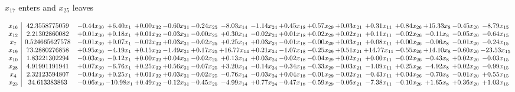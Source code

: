 \documentclass[9pt]{article}
\begin{document}
 $ x_{17} $ enters and $ x_{25} $ leaves 

 \[\begin{array}{c| c c@{\hskip 2pt} c@{\hskip 2pt} c@{\hskip 2pt} c@{\hskip 2pt} c@{\hskip 2pt} c@{\hskip 2pt} c@{\hskip 2pt} c@{\hskip 2pt} c@{\hskip 2pt} c@{\hskip 2pt} c@{\hskip 2pt} c@{\hskip 2pt} c@{\hskip 2pt} c@{\hskip 2pt} c@{\hskip 2pt} }
 x_{16}   &  42.3558775059 & -0.44 x_{30} & +  6.40 x_{1} & +  0.00 x_{32} & -0.60 x_{31} & -0.24 x_{25} & -8.03 x_{14} & -1.14 x_{24} & +  0.45 x_{18} & +  0.57 x_{29} & +  0.03 x_{21} & +  0.31 x_{11} & +  0.84 x_{26} & + 15.33 x_{8} & -0.45 x_{20} & -8.79 x_{15}\\
 x_{12}   &  2.21302860082 & +  0.01 x_{30} & +  0.18 x_{1} & +  0.01 x_{32} & -0.03 x_{31} & -0.00 x_{25} & +  0.30 x_{14} & -0.02 x_{24} & +  0.01 x_{18} & +  0.02 x_{29} & +  0.02 x_{21} & +  0.11 x_{11} & -0.02 x_{26} & -0.11 x_{8} & -0.05 x_{20} & -0.64 x_{15}\\
 x_{7}   &  0.524665627578 & -0.01 x_{30} & +  0.07 x_{1} & -0.02 x_{32} & +  0.03 x_{31} & -0.02 x_{25} & +  0.25 x_{14} & +  0.03 x_{24} & -0.01 x_{18} & -0.00 x_{29} & +  0.03 x_{21} & +  0.08 x_{11} & +  0.00 x_{26} & -0.06 x_{8} & -0.01 x_{20} & -0.24 x_{15}\\
 x_{19}   &  73.2880276858 & +  0.95 x_{30} & -4.19 x_{1} & +  0.15 x_{32} & -1.49 x_{31} & +  0.17 x_{25} & + 16.77 x_{14} & +  0.21 x_{24} & -1.07 x_{18} & -0.25 x_{29} & +  0.51 x_{21} & + 14.77 x_{11} & -0.55 x_{26} & + 14.10 x_{8} & -0.60 x_{20} & -23.53 x_{15}\\
 x_{10}   &  1.83221302294 & -0.03 x_{30} & -0.12 x_{1} & +  0.00 x_{32} & +  0.04 x_{31} & -0.02 x_{25} & +  0.13 x_{14} & +  0.03 x_{24} & -0.02 x_{18} & -0.04 x_{29} & +  0.02 x_{21} & +  0.00 x_{11} & -0.02 x_{26} & -0.43 x_{8} & +  0.02 x_{20} & -0.03 x_{15}\\
 x_{28}   &  4.91991191941 & +  0.07 x_{30} & -6.76 x_{1} & +  0.25 x_{32} & +  0.56 x_{31} & -0.07 x_{25} & +  3.20 x_{14} & -0.14 x_{24} & -0.34 x_{18} & -0.33 x_{29} & -0.03 x_{21} & -1.09 x_{11} & +  0.25 x_{26} & -4.92 x_{8} & +  0.02 x_{20} & -0.99 x_{15}\\
 x_{4}   &  2.32123594807 & -0.04 x_{30} & +  0.25 x_{1} & +  0.01 x_{32} & +  0.03 x_{31} & -0.02 x_{25} & -0.76 x_{14} & -0.03 x_{24} & +  0.04 x_{18} & -0.01 x_{29} & -0.02 x_{21} & -0.43 x_{11} & +  0.04 x_{26} & -0.70 x_{8} & -0.01 x_{20} & +  0.55 x_{15}\\
 x_{23}   &  34.613383863 & -0.06 x_{30} & -10.98 x_{1} & +  0.49 x_{32} & -0.12 x_{31} & -0.45 x_{25} & -4.99 x_{14} & +  0.77 x_{24} & -0.47 x_{18} & -0.59 x_{29} & -0.06 x_{21} & -7.38 x_{11} & -0.10 x_{26} & +  1.65 x_{8} & +  0.36 x_{20} & +  1.03 x_{15}\\

\end{array}\]
\end{document}
